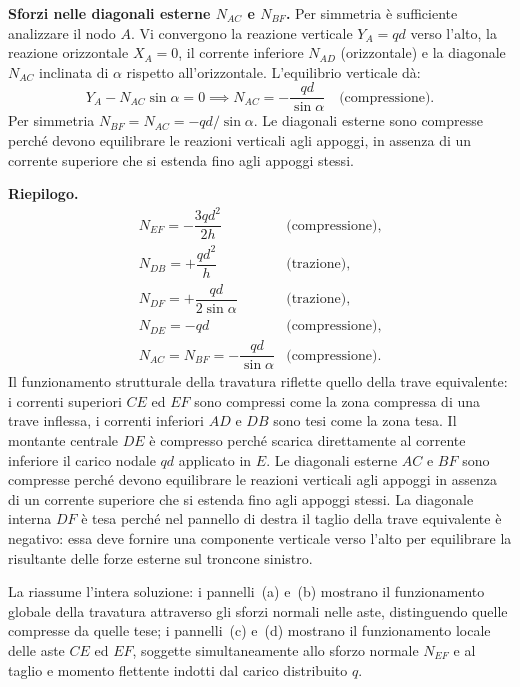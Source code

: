 \begin{esempio}
\begin{svolgimento}
		\medskip
		\noindent\textbf{Sforzi nelle diagonali esterne
			$N_{AC}$ e $N_{BF}$.}
		Per simmetria è sufficiente analizzare il nodo $A$.
		Vi convergono la reazione verticale $Y_A = qd$
		verso l'alto, la reazione orizzontale $X_A = 0$,
		il corrente inferiore $N_{AD}$ (orizzontale) e
		la diagonale $N_{AC}$ inclinata di $\alpha$ rispetto
		all'orizzontale. L'equilibrio verticale dà:
		\[
		Y_A - N_{AC}\sin\alpha = 0
		\implies
		N_{AC} = -\frac{qd}{\sin\alpha}
		\quad\text{(compressione)}.
		\]
		Per simmetria $N_{BF} = N_{AC} = -qd/\sin\alpha$.
		Le diagonali esterne sono compresse perché devono
		equilibrare le reazioni verticali agli appoggi,
		in assenza di un corrente superiore che si estenda
		fino agli appoggi stessi.
		
		



		
		\noindent\textbf{Riepilogo.}
		\[
		\begin{array}{ll}
			N_{EF} = -\dfrac{3qd^2}{2h} & \text{(compressione)}, \\[8pt]
			N_{DB} = +\dfrac{qd^2}{h}   & \text{(trazione)}, \\[8pt]
			N_{DF} = +\dfrac{qd}{2\sin\alpha} & \text{(trazione)}, \\[8pt]
			N_{DE} = -qd & \text{(compressione)}, \\[8pt]
			N_{AC} = N_{BF} = -\dfrac{qd}{\sin\alpha} & \text{(compressione)}.
		\end{array}
		\]
		Il funzionamento strutturale della travatura riflette
		quello della trave equivalente: i correnti superiori
		$CE$ ed $EF$ sono compressi come la zona compressa
		di una trave inflessa, i correnti inferiori $AD$ e
		$DB$ sono tesi come la zona tesa. Il montante centrale
		$DE$ è compresso perché scarica direttamente al corrente
		inferiore il carico nodale $qd$ applicato in $E$.
		Le diagonali esterne $AC$ e $BF$ sono compresse perché
		devono equilibrare le reazioni verticali agli appoggi
		in assenza di un corrente superiore che si estenda
		fino agli appoggi stessi. La diagonale interna $DF$
		è tesa perché nel pannello di destra il taglio della
		trave equivalente è negativo: essa deve fornire una
		componente verticale verso l'alto per equilibrare
		la risultante delle forze esterne sul troncone sinistro.
		
		La  riassume
		l'intera soluzione: i pannelli~(a) e~(b) mostrano
		il funzionamento globale della travatura attraverso
		gli sforzi normali nelle aste, distinguendo quelle
		compresse da quelle tese; i pannelli~(c) e~(d)
		mostrano il funzionamento locale delle aste $CE$
		ed $EF$, soggette simultaneamente allo sforzo
		normale $N_{EF}$ e al taglio e momento flettente
		indotti dal carico distribuito $q$.	
	\end{svolgimento}
\end{esempio}




